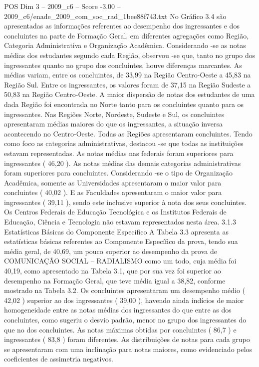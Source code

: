 \begin{textsample}{POS Dim 3 – 2009\_c6 – Score -3.00 – 2009\_c6/enade\_2009\_com\_soc\_rad\_1bee88f743.txt}
No Gráfico 3.4 são apresentadas as informações referentes ao desempenho dos ingressantes e dos concluintes na parte de Formação Geral, em diferentes agregações como Região, Categoria Administrativa e Organização Acadêmica.
Considerando -se as notas médias dos estudantes segundo cada Região, observou -se que, tanto no grupo dos ingressantes quanto no grupo dos concluintes, houve diferenças marcantes.
As médias variam, entre os concluintes, de 33,99 na Região Centro-Oeste a 45,83 na Região Sul.
Entre os ingressantes, os valores foram de 37,15 na Região Sudeste a 50,83 na Região Centro-Oeste.
A maior dispersão de notas dos estudantes de uma dada Região foi encontrada no Norte tanto para os concluintes quanto para os ingressantes.
Nas Regiões Norte, Nordeste, Sudeste e Sul, os concluintes apresentaram médias maiores do que os ingressantes, a situação inversa acontecendo no Centro-Oeste.
Todas as Regiões apresentaram concluintes.
Tendo como foco as categorias administrativas, destacou -se que todas as instituições estavam representadas.
As notas médias nas federais foram superiores para ingressantes ( 46,20 ).
As notas médias das demais categorias administrativas foram superiores para concluintes.
Considerando -se o tipo de Organização Acadêmica, somente as Universidades apresentaram o maior valor para concluintes ( 40,02 ).
E as Faculdades apresentaram o maior valor para ingressantes ( 39,11 ), sendo este inclusive superior à nota dos seus concluintes.
Os Centros Federais de Educação Tecnológica e os Institutos Federais de Educação, Ciência e Tecnologia não estavam representados nesta área. 3.1.3 Estatísticas Básicas do Componente Específico A Tabela 3.3 apresenta as estatísticas básicas referentes ao Componente Específico da prova, tendo sua média geral, de 40,69, um pouco superior ao desempenho da prova de COMUNICAÇÃO SOCIAL – RADIALISMO como um todo, cuja média foi 40,19, como apresentado na Tabela 3.1, que por sua vez foi superior ao desempenho na Formação Geral, que teve média igual a 38,82, conforme mostrado na Tabela 3.2.
Os concluintes apresentaram um desempenho médio ( 42,02 ) superior ao dos ingressantes ( 39,00 ), havendo ainda indícios de maior homogeneidade entre as notas médias dos ingressantes do que entre as dos concluintes, como sugeriu o desvio padrão, menor no grupo dos ingressantes do que no dos concluintes.
As notas máximas obtidas por concluintes ( 86,7 ) e ingressantes ( 83,8 ) foram diferentes.
As distribuições de notas para cada grupo se apresentaram com uma inclinação para notas maiores, como evidenciado pelos coeficientes de assimetria negativos.

\end{textsample}
